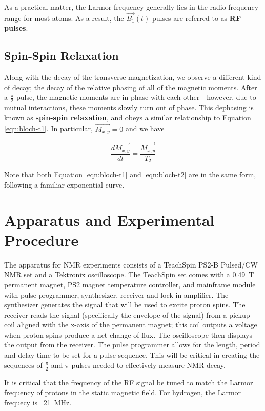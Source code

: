 \documentclass[%
 reprint,
 amsmath,amssymb,
 aps,
]{revtex4-2}
\newcommand{\halfpi}{\frac{\pi}{2}}
\begin{document}
As a practical matter, the Larmor frequency generally lies in the radio frequency range for most atoms. As a result, the $\vec{B_1}(t)$ pulses are referred to as \textbf{RF pulses}. 

\subsection{\label{sec:t2} Spin-Spin Relaxation}

Along with the decay of the transverse magnetization, we observe a different kind of decay; the decay of the relative phasing of all of the magnetic moments. After a $\halfpi$ pulse, the magnetic moments are in phase with each other---however, due to mutual interactions, these moments slowly turn out of phase. This dephasing is known as \textbf{spin-spin relaxation}, and obeys a similar relationship to Equation \ref{eqn:bloch-t1}. In particular, $\vec{M_{x,y}}= 0$ and we have 

\begin{equation}\label{eqn:bloch-t2}
    \frac{d\vec{M_{x,y}}}{dt} = \frac{\vec{M_{x,y}}}{T_2}
\end{equation}

Note that both Equation \ref{eqn:bloch-t1} and \ref{eqn:bloch-t2} are in the same form, following a familiar exponential curve. 

\section{Apparatus and Experimental Procedure}

The apparatus for NMR experiments consists of a TeachSpin PS2-B Pulsed/CW NMR set and a Tektronix oscilloscope. The TeachSpin set comes with a \SI{0.49}{\tesla} permanent magnet, PS2 magnet temperature controller, and mainframe module with pulse programmer, synthesizer, receiver and lock-in amplifier. The synthesizer generates the signal that will be used to excite proton spins. The receiver reads the signal (specifically the envelope of the signal) from a pickup coil aligned with the x-axis of the permanent magnet; this coil outputs a voltage when proton spins produce a net change of flux. The oscilloscope then displays the output from the receiver. The pulse programmer allows for the length, period and delay time to be set for a pulse sequence. This will be critical in creating the sequences of $\halfpi$ and $\pi$ pulses needed to effectively measure NMR decay. 

It is critical that the frequency of the RF signal be tuned to match the Larmor frequency of protons in the static magnetic field. For hydrogen, the Larmor frequecy is ~\SI{21}{\mega\hertz}. 
\end{document}
